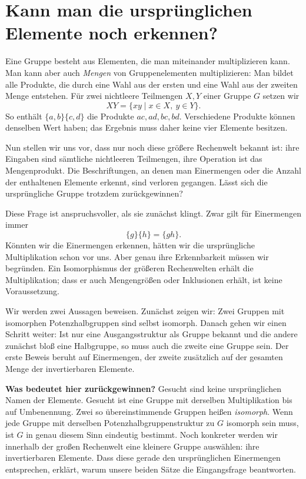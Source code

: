 \section*{Kann man die ursprünglichen Elemente noch erkennen?}
\hypertarget{reconstruction.reading.question}{}

Eine Gruppe besteht aus Elementen, die man miteinander multiplizieren
kann. Man kann aber auch \emph{Mengen} von Gruppenelementen
multiplizieren: Man bildet alle Produkte, die durch eine Wahl aus
der ersten und eine Wahl aus der zweiten Menge entstehen.
Für zwei nichtleere Teilmengen \(X,Y\) einer Gruppe \(G\) setzen wir
\[
  XY=\{xy\mid x\in X,\ y\in Y\}.
\]
So enthält \(\{a,b\}\{c,d\}\) die Produkte \(ac,ad,bc,bd\).
Verschiedene Produkte können denselben Wert haben; das Ergebnis
muss daher keine vier Elemente besitzen.

Nun stellen wir uns vor, dass nur noch diese größere Rechenwelt
bekannt ist: ihre Eingaben sind sämtliche nichtleeren Teilmengen,
ihre Operation ist das Mengenprodukt. Die Beschriftungen, an denen
man Einermengen oder die Anzahl der enthaltenen Elemente erkennt,
sind verloren gegangen. Lässt sich die ursprüngliche Gruppe
trotzdem zurückgewinnen?

Diese Frage ist anspruchsvoller, als sie zunächst klingt. Zwar
gilt für Einermengen immer
\[
  \{g\}\{h\}=\{gh\}.
\]
Könnten wir die Einermengen erkennen, hätten wir die ursprüngliche
Multiplikation schon vor uns. Aber genau ihre Erkennbarkeit müssen
wir begründen. Ein Isomorphismus der größeren Rechenwelten erhält
die Multiplikation; dass er auch Mengengrößen oder Inklusionen
erhält, ist keine Voraussetzung.

Wir werden zwei Aussagen beweisen. Zunächst zeigen wir: Zwei
Gruppen mit isomorphen Potenzhalbgruppen sind selbst isomorph.
Danach gehen wir einen Schritt weiter: Ist nur eine Ausgangsstruktur
als Gruppe bekannt und die andere zunächst bloß eine Halbgruppe,
so muss auch die zweite eine Gruppe sein. Der erste Beweis beruht
auf Einermengen, der zweite zusätzlich auf der gesamten Menge der
invertierbaren Elemente.

\medskip\noindent\textbf{Was bedeutet hier zurückgewinnen?}
Gesucht sind keine ursprünglichen Namen der Elemente. Gesucht ist
eine Gruppe mit derselben Multiplikation bis auf Umbenennung.
Zwei so übereinstimmende Gruppen heißen \emph{isomorph}. Wenn jede
Gruppe mit derselben Potenzhalbgruppenstruktur zu \(G\) isomorph
sein muss, ist \(G\) in genau diesem Sinn eindeutig bestimmt.
Noch konkreter werden wir innerhalb der großen Rechenwelt eine
kleinere Gruppe auswählen: ihre invertierbaren Elemente. Dass
diese gerade den ursprünglichen Einermengen entsprechen, erklärt,
warum unsere beiden Sätze die Eingangsfrage beantworten.

